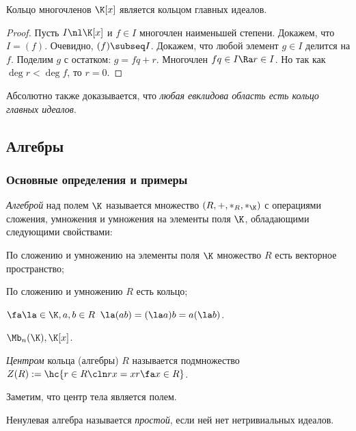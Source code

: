 \documentclass[a4paper]{article}
\begin{document}
\begin{stm}
Кольцо многочленов $\K[x]$ является кольцом главных идеалов.
\end{stm}
\begin{proof}
Пусть $I \nl \K[x]$ и $f \in I$ многочлен наименьшей степени. Докажем, что $I=(f)$. Очевидно,  $(f)
\subseq I$. Докажем, что любой элемент $g \in I$ делится на $f$. Поделим $g$ с остатком: $g=fq+r$. Многочлен
$fq \in I \Ra r \in I$. Но так как $\deg r < \deg f$, то $r=0$.
\end{proof}

Абсолютно также доказывается, что \emph{любая евклидова область есть кольцо главных идеалов}.

\subsection{Алгебры}

\subsubsection{Основные определения и примеры}

\begin{df}
\emph{Алгеброй} над полем $\K$ называется множество $(R, +, *_{R}, *_{\K})$ с операциями сложения,
умножения и умножения на элементы поля $\K$, обладающими следующими свойствами:

 По сложению и умножению на элементы поля $\K$ множество $R$ есть векторное пространство;

 По сложению и умножению $R$ есть кольцо;

 $\fa \la \in \K, a,b \in R \; \; \la(ab)=(\la a)b = a(\la b)$.
\end{df}

\begin{ex}
$\Mb_n(\K), \K[x]$.
\end{ex}

\begin{df}
\emph{Центром} кольца (алгебры) $R$ называется подмножество $Z(R) := \hc{r \in R\cln rx=xr \fa x \in R}$.
\end{df}

Заметим, что центр тела является полем.

\begin{df}
Ненулевая алгебра называется \emph{простой}, если ней нет нетривиальных идеалов.
\end{df}
\end{document}
